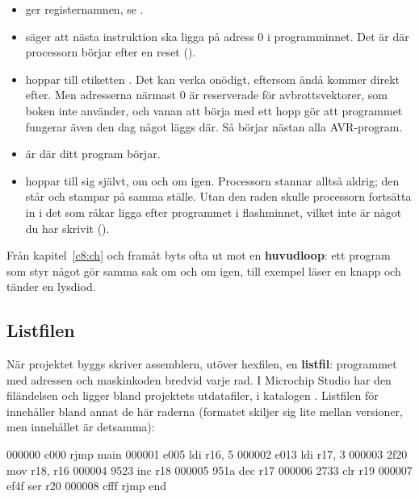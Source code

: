 \begin{itemize}
  \item \textbf{} ger registernamnen, se .
  \item \textbf{} säger att nästa instruktion ska ligga på adress 0 i
    programminnet. Det är där processorn börjar efter en reset ().
  \item \textbf{} hoppar till etiketten . Det kan verka onödigt,
    eftersom  ändå kommer direkt efter. Men adresserna närmast 0 är reserverade för
    avbrottsvektorer, som boken inte använder, och vanan att börja med ett hopp gör att programmet
    fungerar även den dag något läggs där. Så börjar nästan alla AVR-program.
  \item \textbf{} är där ditt program börjar.
  \item \textbf{} hoppar till sig självt, om och om igen. Processorn stannar
    alltså aldrig; den står och stampar på samma ställe. Utan den raden skulle processorn fortsätta
    in i det som råkar ligga efter programmet i flashminnet, vilket inte är något du har skrivit
    ().
\end{itemize}

Från kapitel~\ref{c8:ch} och framåt byts  ofta ut mot en \textbf{huvudloop}: ett
program som styr något gör samma sak om och om igen, till exempel läser en knapp och tänder en
lysdiod.

\subsection{Listfilen}
\label{c7:b7}
När projektet byggs skriver assemblern, utöver hexfilen, en \textbf{listfil}: programmet med
adressen och maskinkoden bredvid varje rad. I Microchip Studio har den filändelsen  och
ligger bland projektets utdatafiler, i katalogen . Listfilen för
 innehåller bland annat de här raderna (formatet skiljer sig lite mellan
versioner, men innehållet är detsamma):

\begin{console}
000000 c000      rjmp main
000001 e005      ldi r16, 5
000002 e013      ldi r17, 3
000003 2f20      mov r18, r16
000004 9523      inc r18
000005 951a      dec r17
000006 2733      clr r19
000007 ef4f      ser r20
000008 cfff      rjmp end
\end{console}

